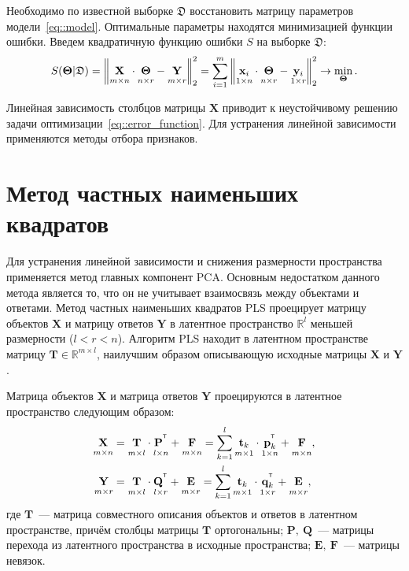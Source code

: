 \documentclass[12pt,twoside]{article}
\newcommand{\bx}{\mathbf{x}}
\newcommand{\by}{\mathbf{y}}
\newcommand{\bY}{\mathbf{Y}}
\newcommand{\bX}{\mathbf{X}}
\newcommand{\bt}{\mathbf{t}}
\newcommand{\bp}{\mathbf{p}}
\newcommand{\bq}{\mathbf{q}}
\newcommand{\bP}{\mathbf{P}}
\newcommand{\bT}{\mathbf{T}}
\newcommand{\bQ}{\mathbf{Q}}
\newcommand{\bE}{\mathbf{E}}
\newcommand{\bF}{\mathbf{F}}
\newcommand{\bTheta}{\boldsymbol{\Theta}}
\newcommand{\T}{^{\text{\tiny\sffamily\upshape\mdseries T}}}
\begin{document}
Необходимо по известной выборке $\mathfrak{D}$ восстановить матрицу параметров модели~\eqref{eq::model}.
Оптимальные параметры находятся минимизацией функции ошибки.
Введем квадратичную функцию ошибки $S$ на выборке $\mathfrak{D}$:
\begin{equation}
	S(\bTheta | \mathfrak{D}) = {\left\| \underset{m \times n}{\vphantom{\by}\mathbf{X}} \cdot \underset{n \times r}{\vphantom{\by}\bTheta} - \underset{m \times r}{\vphantom{\by}\mathbf{Y}} \right\| }_2^2 = \sum_{i=1}^m \left\| \underset{1 \times n}{\vphantom{\by}\bx_i} \cdot \underset{n \times r}{\vphantom{\by}\bTheta} - \underset{1 \times r}{\vphantom{\by}\by_i} \right\|_2^2 \rightarrow\min_{\bTheta}.
\label{eq::error_function}
\end{equation}
 
Линейная зависимость столбцов матрицы $\bX$ приводит к неустойчивому решению задачи оптимизации~\eqref{eq::error_function}. Для устранения линейной зависимости применяются методы отбора признаков.

\section{Метод частных наименьших квадратов}

Для устранения линейной зависимости и снижения размерности пространства применяется метод главных компонент PCA. 
Основным недостатком данного метода является то, что он не учитывает взаимосвязь между объектами и ответами.
Метод частных наименьших квадратов PLS проецирует матрицу объектов $\bX$ и матрицу ответов $\bY$ в латентное пространство $\mathbb{R}^l$ меньшей размерности ($l < r < n$).
Алгоритм PLS находит в латентном пространстве матрицу $\bT \in \mathbb{R}^{m \times l}$, наилучшим образом описывающую исходные матрицы $\bX$ и $\bY$.

Матрица объектов $\bX$ и матрица ответов $\bY$ проецируются в латентное пространство следующим образом: 
\begin{align}
\label{eq::PLS_X}
 \underset{m \times n}{\vphantom{\bQ}\bX} 
 &= \underset{m \times l}{\vphantom{\bQ}\bT} \cdot \underset{l \times n}{\vphantom{\bQ}\bP^{\T}} + \underset{m \times n}{\vphantom{\bQ}\bF} 
 = \sum_{k=1}^l \underset{m \times 1}{\vphantom{\bp_k^{\T}}\bt_k} \cdot \underset{1 \times n}{\bp_k^{\T}} + \underset{m \times n}{\vphantom{\bp_k^{\T}}\bF},\\
 \label{eq::PLS_Y}
 \underset{m \times r}{\vphantom{\bQ}\bY} 
 &= \underset{m \times l}{\vphantom{\bQ}\bT} \cdot \underset{l \times r}{\bQ^{\T}} + \underset{m \times r}{\vphantom{\bQ}\bE}
 =  \sum_{k=1}^l  \underset{m \times 1}{\vphantom{\bq_k^{\T}}\bt_k} \cdot \underset{1 \times r}{\bq_k^{\T}} +  \underset{m \times r}{\vphantom{\bq_k^{\T}}\bE},
\end{align}
где $\bT$~--- матрица совместного описания объектов и ответов в латентном пространстве, причём столбцы матрицы $\bT$ ортогональны; $\bP,\ \bQ$~--- матрицы перехода из латентного пространства в  исходные пространства; $\bE,\ \bF$~--- матрицы невязок. 
\end{document}
